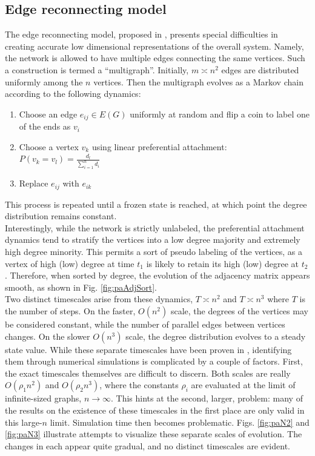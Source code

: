 \documentclass[11pt]{article}
\begin{document}
\subsection{Edge reconnecting model}
\indent The edge reconnecting model, proposed in \cite{Rath2012}, presents special difficulties in creating accurate low dimensional representations of the overall system. Namely, the network is allowed to have multiple edges connecting the same vertices. Such a construction is termed a ``multigraph''. Initially, $m\asymp n^{2}$ edges are distributed uniformly among the $n$ vertices. Then the multigraph evolves as a Markov chain according to the following dynamics:
\begin{enumerate}
\item Choose an edge $e_{ij} \in E(G)$ uniformly at random and flip a coin to label one of the ends as $v_{i}$
\item Choose a vertex $v_{k}$ using linear preferential attachment: $P(v_{k} = v_{l}) = \frac{d_{l}}{\sum\limits_{i=1}^{n} d_{i}}$
\item Replace $e_{ij}$ with $e_{ik}$
\end{enumerate}
This process is repeated until a frozen state is reached, at which point the degree distribution remains constant.\vspace{1mm}\\
\indent Interestingly, while the network is strictly unlabeled, the preferential attachment dynamics tend to stratify the vertices into a low degree majority and extremely high degree minority. This permits a sort of pseudo labeling of the vertices, as a vertex of high (low) degree at time $t_{1}$ is likely to retain its high (low) degree at $t_{2}$. Therefore, when sorted by degree, the evolution of the adjacency matrix appears smooth, as shown in Fig. \ref{fig:paAdjSort}. \vspace{1mm}\\
\indent Two distinct timescales arise from these dynamics, $T\asymp n^{2}$ and $T\asymp n^{3}$ where $T$ is the number of steps. On the faster, $O(n^{2})$ scale, the degrees of the vertices may be considered constant, while the number of parallel edges between vertices changes. On the slower $O(n^{3})$ scale, the degree distribution evolves to a steady state value. While these separate timescales have been proven in \cite{Rath2012}, identifying them through numerical simulations is complicated by a couple of factors. First, the exact timescales themselves are difficult to discern. Both scales are really $O(\rho_{1} n^{2})$ and $O(\rho_{2} n^{3})$, where the constants $\rho_{i}$ are evaluated at the limit of infinite-sized graphs, $n\rightarrow \infty$. This hints at the second, larger, problem: many of the results on the existence of these timescales in the first place are only valid in this large-$n$ limit. Simulation time then becomes problematic. Figs. \ref{fig:paN2} and \ref{fig:paN3} illustrate attempts to visualize these separate scales of evolution. The changes in each appear quite gradual, and no distinct timescales are evident.\\
\end{document}
